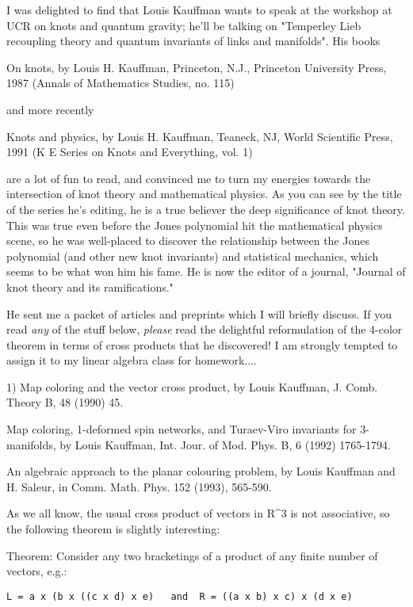 

I was delighted to find that Louis Kauffman wants to speak at the
workshop at UCR on knots and quantum gravity; he'll be talking
on "Temperley Lieb recoupling theory and quantum invariants of links and
manifolds".    His books

On knots, by Louis H. Kauffman, Princeton, N.J., Princeton University
Press, 1987 (Annals of Mathematics Studies, no. 115)

and more recently

Knots and physics, by Louis H. Kauffman, Teaneck, NJ, World Scientific
Press, 1991 (K \text{\&}  E Series on Knots and Everything, vol. 1)

are a lot of fun to read, and convinced me to turn my energies
towards the intersection of knot theory and mathematical physics.  As
you can see by the title of the series he's editing, he is a true
believer the deep significance of knot theory.  This was true even
before the Jones polynomial hit the mathematical physics scene, so he
was well-placed to discover the relationship between the Jones
polynomial (and other new knot invariants) and statistical mechanics,
which seems to be what won him his fame.  He is now the editor of a
journal, "Journal of knot theory and its ramifications."  

He sent me a packet of articles and preprints which I will briefly
discuss.  If you read \emph{any} of the stuff below, \emph{please} read the
delightful reformulation of the 4-color theorem in terms of cross
products that he discovered!  I am strongly tempted to assign it to my
linear algebra class for homework....

1)  Map coloring and the vector cross product, by Louis Kauffman, J. Comb.
Theory B, 48 (1990) 45.

Map coloring, 1-deformed spin networks, and Turaev-Viro
invariants for 3-manifolds, by Louis Kauffman, Int. Jour. of Mod. Phys.
B, 6 (1992) 1765-1794. 

An algebraic approach to the planar colouring problem, by Louis Kauffman
and H. Saleur, in Comm. Math. Phys. 152 (1993), 565-590.

As we all know, the usual cross product of vectors in R^3 is not
associative, so the following theorem is slightly interesting:

Theorem: Consider any two bracketings of a product of any finite number
of vectors, e.g.:

\begin{verbatim}
L = a x (b x ((c x d) x e)   and  R = ((a x b) x c) x (d x e)
\end{verbatim}
    

